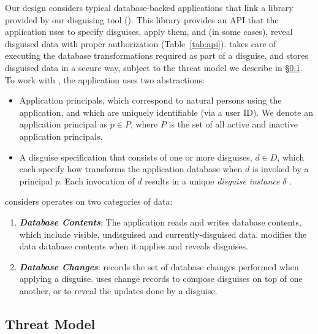 Our design considers typical database-backed applications that link a library provided by our disguising
tool (\sys).
%
This library provides an API that the application uses to specify disguises, apply them, and (in some
cases), reveal disguised data with proper authorization (Table~\ref{tab:api}).
%
\sys takes care of executing the database transformations required as part of a disguise, and stores
disguised data in a secure way, subject to the threat model we describe in \S\ref{s:threat}.
%
To work with \sys, the application uses two abstractions:
\begin{itemize}
    \item Application principals, which correspond to natural persons using the application, and
	which are uniquely identifiable (\eg via a user ID).
	We denote an application principal as $p \in P$, where $P$ is the set of all active and
	inactive application principals.
    \item A disguise specification that consists of one or more disguises, $d \in D$, which each specify
	how \sys transforms the application database when $d$ is invoked by a principal $p$.
	Each invocation of $d$ results in a unique \emph{disguise instance} $\delta$
        .
\end{itemize}
%
\sys considers operates on two categories of data:
\begin{enumerate}
    \item \emph{\textbf{Database Contents}}: The application reads and writes database
        contents, which include visible, undisguised and currently-disguised data.
        \sys modifies the data database contents when it applies and reveals disguises.
    \item \emph{\textbf{Database Changes}}: \sys records the set of database changes performed when
        applying a disguise. \sys uses change records to compose disguises on top of one another, or to
        reveal the updates done by a disguise. 
\end{enumerate}

\subsection{Threat Model}
\label{s:threat}

